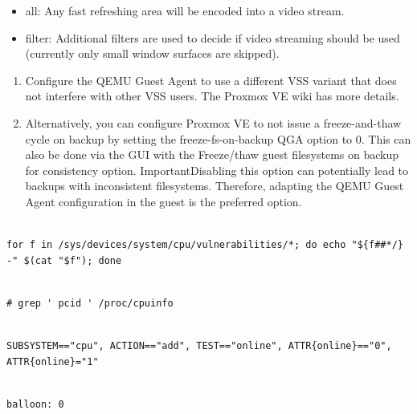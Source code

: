 \begin{itemize}[leftmargin=2cm]

	\item all: Any fast refreshing area will be encoded into a video stream.

	\item filter: Additional filters are used to decide if video streaming should be used (currently only small window surfaces are skipped).

\end{itemize}

\begin{enumerate}[leftmargin=2cm]

	\item Configure the QEMU Guest Agent to use a different VSS variant that does not interfere with other VSS users. The Proxmox VE wiki has more details.

	\item Alternatively, you can configure Proxmox VE to not issue a freeze-and-thaw cycle on backup by setting the freeze-fs-on-backup QGA option to 0. This can also be done via the GUI with the Freeze/thaw guest filesystems on backup for consistency option. ImportantDisabling this option can potentially lead to backups with inconsistent filesystems. Therefore, adapting the QEMU Guest Agent configuration in the guest is the preferred option.

\end{enumerate}

\begin{lstlisting}

for f in /sys/devices/system/cpu/vulnerabilities/*; do echo "${f##*/} -" $(cat "$f"); done

\end{lstlisting}

\begin{lstlisting}

# grep ' pcid ' /proc/cpuinfo

\end{lstlisting}

\begin{lstlisting}

SUBSYSTEM=="cpu", ACTION=="add", TEST=="online", ATTR{online}=="0", ATTR{online}="1"

\end{lstlisting}

\begin{lstlisting}

balloon: 0

\end{lstlisting}

